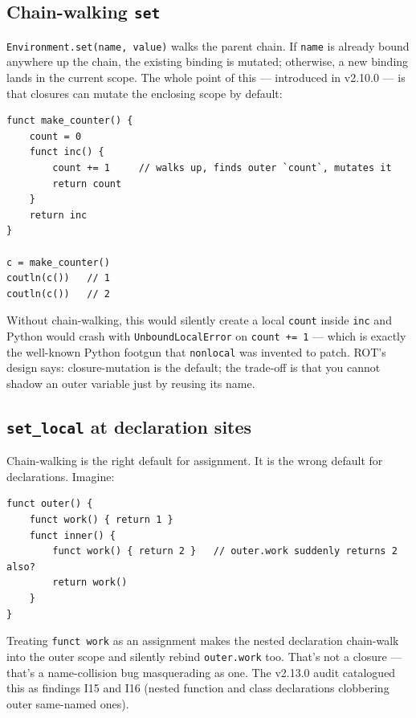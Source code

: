 \documentclass[11pt]{article}
\begin{document}
\subsection{Chain-walking \texttt{set}}

\texttt{Environment.set(name, value)} walks the parent chain. If \texttt{name} is already bound anywhere up the chain, the existing binding is mutated; otherwise, a new binding lands in the current scope. The whole point of this --- introduced in v2.10.0 --- is that closures can mutate the enclosing scope by default:

\begin{lstlisting}[style=rotstyle]
funct make_counter() {
    count = 0
    funct inc() {
        count += 1     // walks up, finds outer `count`, mutates it
        return count
    }
    return inc
}

c = make_counter()
coutln(c())   // 1
coutln(c())   // 2
\end{lstlisting}

Without chain-walking, this would silently create a local \texttt{count} inside \texttt{inc} and Python would crash with \texttt{UnboundLocalError} on \texttt{count += 1} --- which is exactly the well-known Python footgun that \texttt{nonlocal} was invented to patch. ROT's design says: closure-mutation is the default; the trade-off is that you cannot shadow an outer variable just by reusing its name.

\subsection{\texttt{set\_local} at declaration sites}

Chain-walking is the right default for assignment. It is the wrong default for declarations. Imagine:

\begin{lstlisting}[style=rotstyle]
funct outer() {
    funct work() { return 1 }
    funct inner() {
        funct work() { return 2 }   // outer.work suddenly returns 2 also?
        return work()
    }
}
\end{lstlisting}

Treating \texttt{funct work} as an assignment makes the nested declaration chain-walk into the outer scope and silently rebind \texttt{outer.work} too. That's not a closure --- that's a name-collision bug masquerading as one. The v2.13.0 audit catalogued this as findings I15 and I16 (nested function and class declarations clobbering outer same-named ones).
\end{document}
